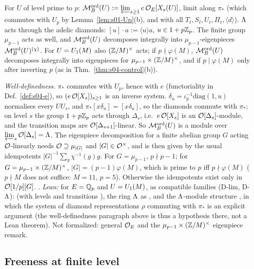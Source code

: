 \begin{definition}\label{def:s04-Mord}
For $U$ of level prime to $p$: $\mathcal{M}^{\mathrm{ord}}_B(U):=\varprojlim_{s\ge1}e\,\mathcal{O}_E[X_s(U)]$, limit along $\pi_*$ (which commutes with $U_p$ by
Lemma~\ref{lem:s01-Up}(b), and with all $T_\ell,S_\ell,U_\ell,\Pi_\ell,\langle d\rangle$). $\Lambda$ acts through the adelic diamonds:
$[u]\cdot a:=\langle u\rangle a$, $u\in1+p\mathbb{Z}_p$. The finite group $\mu_{p-1}$ acts as well, and $\mathcal{M}^{\mathrm{ord}}_B(U)$ decomposes integrally into
$\mu_{p-1}$-eigenpieces $\mathcal{M}^{\mathrm{ord}}_B(U)^{(\chi)}$. For $U=U_1(M)$ also $(\mathbb{Z}/M)^\times$ acts; if $p\nmid\varphi(M)$, $\mathcal{M}^{\mathrm{ord}}_B(U)$ decomposes
integrally into eigenpieces for $\mu_{p-1}\times(\mathbb{Z}/M)^\times$, and if $p\mid\varphi(M)$ only after inverting $p$ (as in
Thm.~\ref{thm:s04-control}(b)).
\end{definition}
\noindent\emph{Well-definedness.} $\pi_*$ commutes with $U_p$, hence with $e$ (functoriality in Def.~\ref{def:s04-e}), so
$(e\,\mathcal{O}[X_s])_{s\ge1}$ is an inverse system. $\delta_u=\iota_p^{-1}\mathrm{diag}(1,u)$ normalises every $UU_s$, and $\pi_*[x\delta_u]=[x\delta_u]$,
so the diamonds commute with $\pi_*$; on level $s$ the group $1+p\mathbb{Z}_p$ acts through $\Delta_s$, i.e.\ $e\,\mathcal{O}[X_s]$ is an
$\mathcal{O}[\Delta_s]$-module, and the transition maps are $\mathcal{O}[\Delta_{s+1}]$-linear. So $\mathcal{M}^{\mathrm{ord}}_B(U)$ is a module over
$\varprojlim_s\mathcal{O}[\Delta_s]=\Lambda$. The eigenpiece decomposition for a finite abelian group $G$ acting $\mathcal{O}$-linearly needs $\mathcal{O}\supseteq\mu_{|G|}$ and
$|G|\in\mathcal{O}^\times$, and is then given by the usual idempotents $|G|^{-1}\sum_g\chi^{-1}(g)g$. For $G=\mu_{p-1}$, $p\nmid p-1$; for
$G=\mu_{p-1}\times(\mathbb{Z}/M)^\times$, $|G|=(p-1)\varphi(M)$, which is prime to $p$ iff $p\nmid\varphi(M)$ ($p\nmid M$ does not suffice:
$M=11$, $p=5$). Otherwise the idempotents exist only in $\mathcal{O}[1/p][G]$. \stproved.
\emph{Lean:} \stformal{} for $E=\mathbb{Q}_p$ and $U=U_1(M)$, as compatible families (D-lim, D-$\Lambda$):  (with levels
 and transitions ), the ring $\Lambda$
as , and the $\Lambda$-module structure , in which the system of
diamond representations $\rho$ commuting with $\pi_*$ is an explicit argument (the well-definedness paragraph above is thus a hypothesis there, not
a Lean theorem). Not formalized: general $\mathcal{O}_E$ and the $\mu_{p-1}\times(\mathbb{Z}/M)^\times$ eigenpiece remark.

\subsection{Freeness at finite level}

